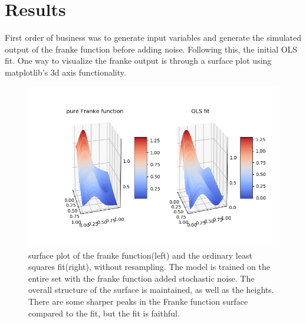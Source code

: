 \documentclass[ 12pt, a4paper ]{article}
\begin{document}
\section{Results}

First order of business was to generate input variables and generate the simulated output of
the franke function before adding noise. Following this, the initial OLS fit. One way to 
visualize the franke output is through a surface plot using matplotlib's 3d axis functionality.

\begin{figure}
\includegraphics[scale=0.6]{frankesurface.png}
\caption{
    surface plot of the franke function(left) and the ordinary least squares fit(right), 
    without resampling. The model is trained on the entire set with the franke function 
    added stochastic noise.
    The overall structure of the surface is maintained, as well as the heights. There are 
    some sharper peaks in the Franke function surface compared to the fit, but the fit is
    faithful.
}
\label{fig:frankesurface}
\end{figure}
\end{document}
